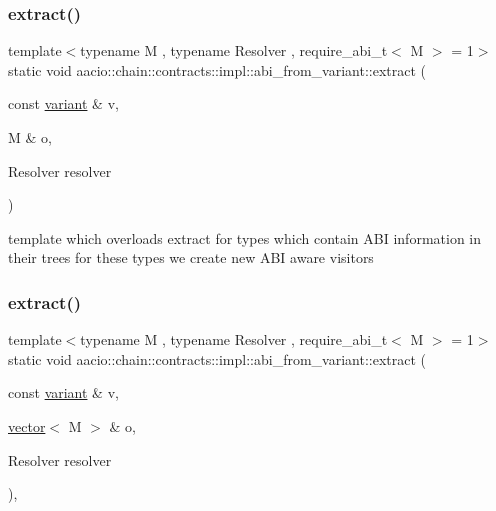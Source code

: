 \subsubsection{\texorpdfstring{extract()}{extract()}\hspace{0.1cm}{\footnotesize\ttfamily [2/4]}}
{\footnotesize\ttfamily template$<$typename M , typename Resolver , require\+\_\+abi\+\_\+t$<$ M $>$  = 1$>$ \\
static void aacio\+::chain\+::contracts\+::impl\+::abi\+\_\+from\+\_\+variant\+::extract (\begin{DoxyParamCaption}\item[{const \mbox{\hyperlink{classfc_1_1variant}{variant}} \&}]{v,  }\item[{M \&}]{o,  }\item[{Resolver}]{resolver }\end{DoxyParamCaption})\hspace{0.3cm}{\ttfamily [static]}}

template which overloads extract for types which contain A\+BI information in their trees for these types we create new A\+BI aware visitors \mbox{\label{structaacio_1_1chain_1_1contracts_1_1impl_1_1abi__from__variant_abd7d961246232db8be8d0550876d47d6}} 
\subsubsection{\texorpdfstring{extract()}{extract()}\hspace{0.1cm}{\footnotesize\ttfamily [3/4]}}
{\footnotesize\ttfamily template$<$typename M , typename Resolver , require\+\_\+abi\+\_\+t$<$ M $>$  = 1$>$ \\
static void aacio\+::chain\+::contracts\+::impl\+::abi\+\_\+from\+\_\+variant\+::extract (\begin{DoxyParamCaption}\item[{const \mbox{\hyperlink{classfc_1_1variant}{variant}} \&}]{v,  }\item[{\mbox{\hyperlink{classstd_1_1vector}{vector}}$<$ M $>$ \&}]{o,  }\item[{Resolver}]{resolver }\end{DoxyParamCaption})\hspace{0.3cm}{\ttfamily [inline]}, {\ttfamily [static]}}

